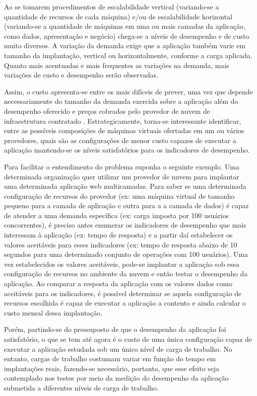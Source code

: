 Ao se tomarem procedimentos de escalabilidade vertical (variando-se a quantidade de recursos de 
cada máquina) e/ou de escalabilidade horizontal (variando-se a quantidade de máquinas em uma ou 
mais camadas da aplicação, como dados, apresentação e negócio) chega-se a níveis de desempenho e de custo muito 
diversos. A variação da demanda exige que a aplicação também varie em tamanho da implantação, 
vertical ou horizontalmente, conforme a carga aplicada. Quanto mais acentuadas e mais frequentes 
as variações na demanda, mais variações de custo e desempenho serão observadas.

Assim, o custo apresenta-se entre os mais difíceis de prever, uma vez que depende necessariamente 
do tamanho da demanda exercida sobre a aplicação além do desempenho oferecido e preços cobrados 
pelo provedor de nuvem de infraestrutura contratado \cite{cunha2012ambiente}. Estrategicamente, 
torna-se interessante identificar, entre as possíveis composições de máquinas virtuais ofertadas 
em um ou vários provedores, quais são as configurações de menor custo capazes de executar a 
aplicação mantendo-se os níveis satisfatórios para os indicadores de desempenho.

Para facilitar o entendimento do problema suponha o seguinte exemplo. Uma
determinada organização quer utilizar um provedor de nuvem para implantar uma
determinada aplicação web multicamadas. Para saber se uma determinada 
configuração de recursos do provedor (ex: uma máquina virtual de tamanho
pequeno para a camada de aplicação e outra para a a camada de dados) é capaz de
atender a uma demanda específica (ex: carga imposta por 100 usuários
concorrentes), é preciso antes enumerar os indicadores de desempenho que mais
interessam à aplicação (ex: tempo de resposta) e a partir daí estabelecer os
valores aceitáveis para esses indicadores (ex: tempo de resposta abaixo de 10
segundos para uma determinado conjunto de operações com 100 usuários).
Uma vez estabelecidos os valores aceitáveis, pode-se implantar a aplicação 
sob essa configuração de recursos no ambiente da nuvem e então testar o
desempenho da aplicação. Ao comparar a resposta da aplicação com os valores
dados como aceitáveis para os indicadores, é possível determinar se aquela configuração de recursos 
escolhida é capaz de executar a aplicação a 
contento e ainda calcular o custo mensal dessa implantação.

Porém, partindo-se do pressuposto de que o desempenho da aplicação foi satisfatório, o que se 
tem até agora é o custo de uma única configuração capaz de executar a aplicação estudada sob 
um único nível de carga de trabalho. No entanto, cargas de trabalho costumam variar em função do tempo 
em implantações reais, fazendo-se necessário, portanto, que esse efeito seja contemplado nos 
testes por meio da medição do desempenho da aplicação submetida a diferentes níveis de carga 
de trabalho.

